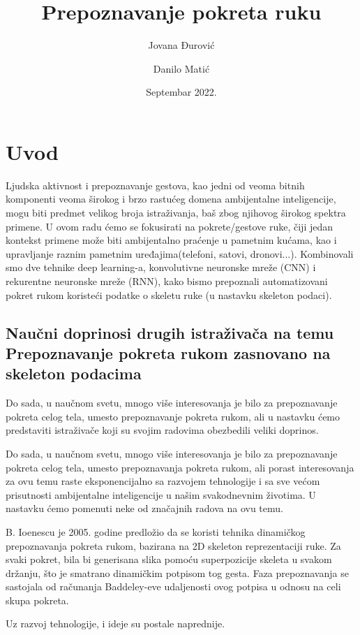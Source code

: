 \documentclass{article}
\title{Prepoznavanje pokreta ruku}
\author{Jovana Đurović \and Danilo Matić}
\date{Septembar 2022.}
\begin{document}
\maketitle

\newpage

\section{Uvod}

Ljudska aktivnost i prepoznavanje gestova, kao jedni od veoma bitnih komponenti veoma širokog i brzo rastućeg domena ambijentalne inteligencije, mogu biti predmet velikog broja istraživanja, baš zbog njihovog širokog spektra primene. U ovom radu ćemo se fokusirati na pokrete/gestove ruke, čiji jedan kontekst primene može biti ambijentalno praćenje u pametnim kućama, kao i upravljanje raznim pametnim uređajima(telefoni, satovi, dronovi...). Kombinovali smo dve tehnike deep learning-a, konvolutivne neuronske mreže (CNN) i rekurentne neuronske mreže (RNN), kako bismo prepoznali automatizovani pokret rukom koristeći podatke o skeletu ruke (u nastavku skeleton podaci).


\subsection{Naučni doprinosi drugih istraživača na temu Prepoznavanje pokreta rukom zasnovano na skeleton podacima}
Do sada, u naučnom svetu, mnogo više interesovanja je bilo za prepoznavanje pokreta celog tela, umesto prepoznavanje pokreta rukom, ali u nastavku ćemo predstaviti istraživače koji su svojim radovima obezbedili veliki doprinos.

Do sada, u naučnom svetu, mnogo više interesovanja je bilo za prepoznavanje pokreta celog tela, umesto prepoznavanja pokreta rukom, ali porast interesovanja za ovu temu raste eksponencijalno sa razvojem tehnologije i sa sve većom prisutnosti ambijentalne inteligencije u našim svakodnevnim životima. U nastavku ćemo pomenuti neke od značajnih radova na ovu temu.

B. Ioenescu je 2005. godine predložio da se koristi tehnika dinamičkog prepoznavanja pokreta rukom, bazirana na 2D skeleton reprezentaciji ruke. Za svaki pokret, bila bi generisana slika pomoću superpozicije skeleta u svakom držanju, što je smatrano dinamičkim potpisom tog gesta. Faza prepoznavanja se sastojala od računanja Baddeley-eve udaljenosti ovog potpisa u odnosu na celi skupa pokreta.

Uz razvoj tehnologije, i ideje su postale naprednije.
\end{document}
